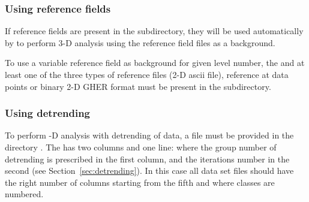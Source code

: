 \subsubsection{Using reference fields}


If reference fields are present in the  subdirectory, they will be used automatically by \diva to perform  3-D analysis using the reference field files as a background.

To use a variable reference field as background for given level number, the  and at least one of the three types of reference files  (2-D ascii file), reference at data points or  binary 2-D GHER format must be present in the  subdirectory.



\begin{center}
\end{center}



\subsubsection{Using detrending}


To perform -D analysis with detrending  of data, a  file must be provided in the directory . The   has two columns and one line: where the group number of detrending is prescribed in the first column, and the iterations number in the second (see Section~\ref{sec:detrending}). In this case all data set files should have the right number of columns starting from the fifth and where classes are numbered.


\begin{center}
\end{center}




